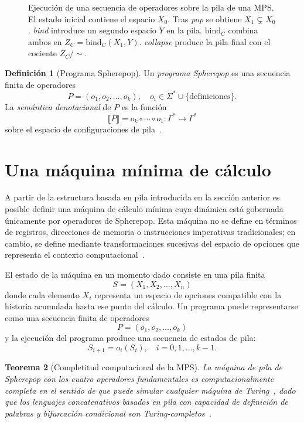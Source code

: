 \documentclass[12pt]{article}
\theoremstyle{plain}
\newtheorem{theorem}{Teorema}[section]
\theoremstyle{definition}
\newtheorem{definition}[theorem]{Definición}
\begin{document}
\begin{figure}[ht]
\caption{Ejecución de una secuencia de operadores sobre la pila de una MPS. El estado inicial contiene el espacio $X_0$. Tras \emph{pop} se obtiene $X_1 \subsetneq X_0$. \emph{bind} introduce un segundo espacio $Y$ en la pila. $\mathrm{bind}_C$ combina ambos en $Z_C = \mathrm{bind}_C(X_1, Y)$. \emph{collapse} produce la pila final con el cociente $Z_C / {\sim}$.}
\label{fig:pila_ejecucion}
\end{figure}

\begin{definition}[Programa Spherepop]
\label{def:programa}
Un \emph{programa Spherepop} es una secuencia finita de operadores
\[
P = (o_1, o_2, \ldots, o_k), \quad o_i \in \Sigma^* \cup \{\text{definiciones}\}.
\]
La \emph{semántica denotacional} de $P$ es la función
\[
\llbracket P \rrbracket = o_k \circ \cdots \circ o_1 : \Gamma^* \to \Gamma^*
\]
sobre el espacio de configuraciones de pila~\cite{plotkin,abramsky}.
\end{definition}

\section{Una máquina mínima de cálculo}
\label{sec:maquina}

A partir de la estructura basada en pila introducida en la sección anterior es posible definir una máquina de cálculo mínima cuya dinámica está gobernada únicamente por operadores de Spherepop. Esta máquina no se define en términos de registros, direcciones de memoria o instrucciones imperativas tradicionales; en cambio, se define mediante transformaciones sucesivas del espacio de opciones que representa el contexto computacional~\cite{moore,turner}.

El estado de la máquina en un momento dado consiste en una pila finita
\[
S = (X_1, X_2, \ldots, X_n)
\]
donde cada elemento $X_i$ representa un espacio de opciones compatible con la historia acumulada hasta ese punto del cálculo. Un programa puede representarse como una secuencia finita de operadores
\[
P = (o_1, o_2, \ldots, o_k)
\]
y la ejecución del programa produce una secuencia de estados de pila:
\[
S_{i+1} = o_i(S_i), \quad i = 0, 1, \ldots, k-1.
\]

\begin{theorem}[Completitud computacional de la MPS]
\label{thm:completitud}
La máquina de pila de Spherepop con los cuatro operadores fundamentales es computacionalmente completa en el sentido de que puede simular cualquier máquina de Turing~\cite{turing}, dado que los lenguajes concatenativos basados en pila con capacidad de definición de palabras y bifurcación condicional son Turing-completos~\cite{moore,turner}.
\end{theorem}
\end{document}
